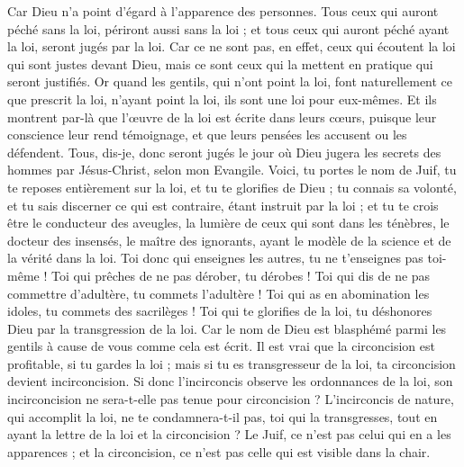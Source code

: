 \begin{multicols}{2}
Car Dieu n'a point d'égard à l'apparence des personnes.
Tous ceux qui auront péché sans la loi, périront aussi sans la loi ; et tous ceux qui auront péché ayant la loi, seront jugés par la loi.
Car ce ne sont pas, en effet, ceux qui écoutent la loi qui sont justes devant Dieu, mais ce sont ceux qui la mettent en pratique qui seront justifiés.
Or quand les gentils, qui n'ont point la loi, font naturellement ce que prescrit la loi, n'ayant point la loi, ils sont une loi pour eux-mêmes.
Et ils montrent par-là que l’œuvre de la loi est écrite dans leurs cœurs, puisque leur conscience leur rend témoignage, et que leurs pensées les accusent ou les défendent.
Tous, dis-je, donc seront jugés le jour où Dieu jugera les secrets des hommes par Jésus-Christ, selon mon Evangile.
Voici, tu portes le nom de Juif, tu te reposes entièrement sur la loi, et tu te glorifies de Dieu ;
tu connais sa volonté, et tu sais discerner ce qui est contraire, étant instruit par la loi ; 
et tu te crois être le conducteur des aveugles, la lumière de ceux qui sont dans les ténèbres,
le docteur des insensés, le maître des ignorants, ayant le modèle de la science et de la vérité dans la loi.
Toi donc qui enseignes les autres, tu ne t’enseignes pas toi-même ! Toi qui prêches de ne pas dérober, tu dérobes !
Toi qui dis de ne pas commettre d’adultère, tu commets l’adultère ! Toi qui as en abomination les idoles, tu commets des sacrilèges !
Toi qui te glorifies de la loi, tu déshonores Dieu par la transgression de la loi.
Car le nom de Dieu est blasphémé parmi les gentils à cause de vous comme cela est écrit.
Il est vrai que la circoncision est profitable, si tu gardes la loi ; mais si tu es transgresseur de la loi, ta circoncision devient incirconcision.
Si donc l’incirconcis observe les ordonnances de la loi, son incirconcision ne sera-t-elle pas tenue pour circoncision ?
L’incirconcis de nature, qui accomplit la loi, ne te condamnera-t-il pas, toi qui la transgresses, tout en ayant la lettre de la loi et la circoncision ?
Le Juif, ce n’est pas celui qui en a les apparences ; et la circoncision, ce n’est pas celle qui est visible dans la chair.

\end{multicols}
